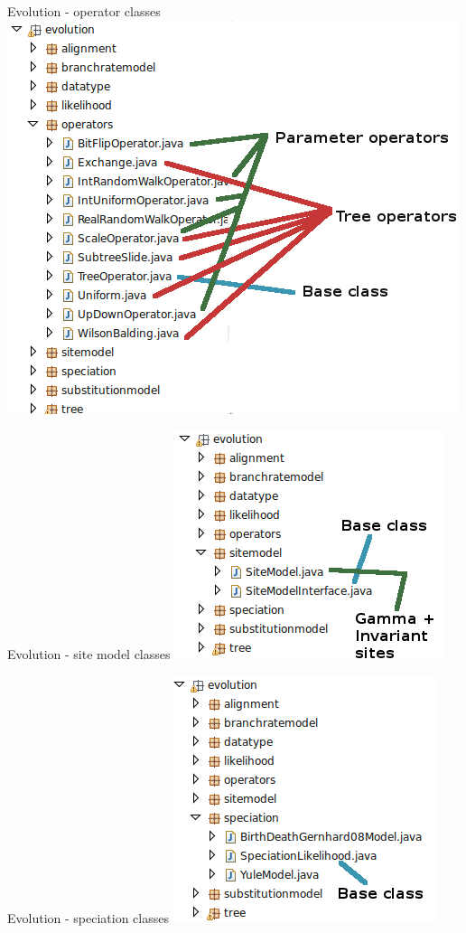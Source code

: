 \documentclass{beamer}
\theoremstyle{definition}
\begin{document}
\begin{frame}[containsverbatim]{Evolution - operator classes}
\includegraphics[width=\textwidth]{classes9.png}
\end{frame}


\begin{frame}[containsverbatim]{Evolution - site model classes}
\includegraphics{classes10.png}
\end{frame}

\begin{frame}[containsverbatim]{Evolution - speciation classes}
\includegraphics{classes11.png}
\end{frame}
\end{document}
